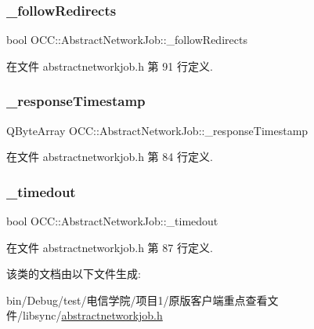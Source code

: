 \subsubsection{\texorpdfstring{\+\_\+follow\+Redirects}{\_followRedirects}}
{\footnotesize\ttfamily bool O\+C\+C\+::\+Abstract\+Network\+Job\+::\+\_\+follow\+Redirects\hspace{0.3cm}{\ttfamily [protected]}}



在文件 abstractnetworkjob.\+h 第 91 行定义.

\mbox{\label{class_o_c_c_1_1_abstract_network_job_a135fa86efd55fdcd58d0c28c70ac12d1}} 
\subsubsection{\texorpdfstring{\+\_\+response\+Timestamp}{\_responseTimestamp}}
{\footnotesize\ttfamily Q\+Byte\+Array O\+C\+C\+::\+Abstract\+Network\+Job\+::\+\_\+response\+Timestamp\hspace{0.3cm}{\ttfamily [protected]}}



在文件 abstractnetworkjob.\+h 第 84 行定义.

\mbox{\label{class_o_c_c_1_1_abstract_network_job_af29695f2d78215243f9db1e91a8302a5}} 
\subsubsection{\texorpdfstring{\+\_\+timedout}{\_timedout}}
{\footnotesize\ttfamily bool O\+C\+C\+::\+Abstract\+Network\+Job\+::\+\_\+timedout\hspace{0.3cm}{\ttfamily [protected]}}



在文件 abstractnetworkjob.\+h 第 87 行定义.



该类的文档由以下文件生成\+:\begin{DoxyCompactItemize}
\item 
bin/\+Debug/test/电信学院/项目1/原版客户端重点查看文件/libsync/\hyperlink{abstractnetworkjob_8h}{abstractnetworkjob.\+h}\end{DoxyCompactItemize}
